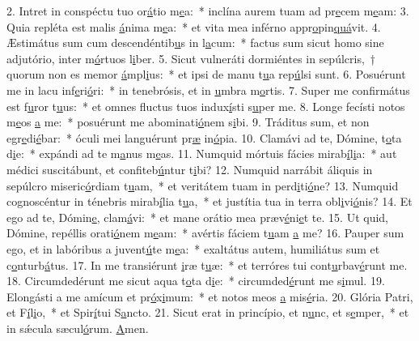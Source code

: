 2. Intret in conspéctu tuo or\uline{á}tio m\uline{e}a:~* inclína aurem tuam ad pr\uline{e}cem m\uline{e}am:
3. Quia repléta est malis \uline{á}nima m\uline{e}a:~* et vita mea inférno appr\uline{o}pin\uline{quá}vit.
4. Æstimátus sum cum descendéntib\uline{u}s in l\uline{a}cum:~* factus sum sicut homo sine adjutório, inter m\uline{ó}rtuos l\uline{i}ber.
5. Sicut vulneráti dormiéntes in sepúlcris,~† quorum non es memor \uline{á}mpl\uline{i}us:~* et ipsi de manu t\uline{u}a rep\uline{ú}lsi sunt.
6. Posuérunt me in lacu inf\uline{e}ri\uline{ó}ri:~* in tenebrósis, et in \uline{u}mbra m\uline{o}rtis.
7. Super me confirmátus est f\uline{u}ror t\uline{u}us:~* et omnes fluctus tuos indux\uline{í}sti s\uline{u}per me.
8. Longe fecísti notos m\uline{e}os \uline{a} me:~* posuérunt me abominati\uline{ó}nem s\uline{i}bi.
9. Tráditus sum, et non egr\uline{e}di\uline{é}bar:~* óculi mei languérunt pr\uline{æ} in\uline{ó}pia.
10. Clamávi ad te, Dómine, t\uline{o}ta d\uline{i}e:~* expándi ad te m\uline{a}nus m\uline{e}as.
11. Numquid mórtuis fácies mirab\uline{í}l\uline{i}a:~* aut médici suscitábunt, et confiteb\uline{ú}ntur t\uline{i}bi?
12. Numquid narrábit áliquis in sepúlcro miseric\uline{ó}rdiam t\uline{u}am,~* et veritátem tuam in perd\uline{i}ti\uline{ó}ne?
13. Numquid cognoscéntur in ténebris mirab\uline{í}lia t\uline{u}a,~* et justítia tua in terra obl\uline{i}vi\uline{ó}nis?
14. Et ego ad te, Dómin\uline{e}, clam\uline{á}vi:~* et mane orátio mea præv\uline{é}ni\uline{e}t te.
15. Ut quid, Dómine, repéllis orati\uline{ó}nem m\uline{e}am:~* avértis fáciem t\uline{u}am \uline{a} me?
16. Pauper sum ego, et in labóribus a juvent\uline{ú}te m\uline{e}a:~* exaltátus autem, humiliátus sum et c\uline{o}nturb\uline{á}tus.
17. In me transiérunt \uline{i}ræ t\uline{u}æ:~* et terróres tui cont\uline{u}rbav\uline{é}runt me.
18. Circumdedérunt me sicut aqua t\uline{o}ta d\uline{i}e:~* circumded\uline{é}runt me s\uline{i}mul.
19. Elongásti a me amícum et pr\uline{ó}x\uline{i}mum:~* et notos meos \uline{a} mis\uline{é}ria.
20. Glória Patri, et F\uline{í}l\uline{i}o,~* et Spir\uline{í}tui S\uline{a}ncto.
21. Sicut erat in princípio, et n\uline{u}nc, et s\uline{e}mper,~* et in sǽcula sæcul\uline{ó}rum. \uline{A}men.
